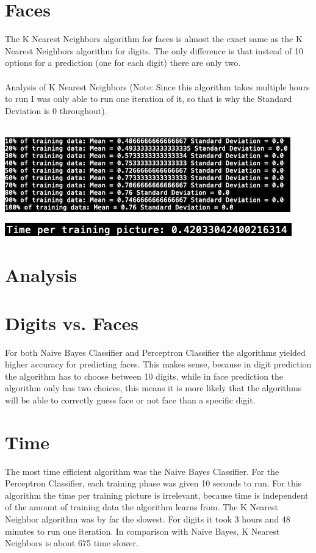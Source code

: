 \documentclass[12pt]{article}
\begin{document}
\section*{Faces}
The K Nearest Neighbors algorithm for faces is almost the exact same as the K Nearest Neighbors algorithm for digits. The only difference is that instead of 10 options for a prediction (one for each digit) there are only two.\\\\
Analysis of K Nearest Neighbors (Note: Since this algorithm takes multiple hours to run I was only able to run one iteration of it, so that is why the Standard Deviation is 0 throughout).\\\\

\begin{center}
\includegraphics{statsFaceKnn.png}
\end{center}

\begin{center}
\includegraphics{timeStatsFaceKnn.png}
\end{center}

\section*{Analysis}
\section*{Digits vs. Faces}
For both Naive Bayes Classifier and Perceptron Classifier the algorithms yielded higher accuracy for predicting faces. This makes sense, because in digit prediction the algorithm has to choose between 10 digits, while in face prediction the algorithm only has two choices, this means it is more likely that the algorithms will be able to correctly guess face or not face than a specific digit. \\

\section*{Time}
The most time efficient algorithm was the Naive Bayes Classifier. For the Perceptron Classifier, each training phase was given 10 seconds to run. For this algorithm the time per training picture is irrelevant, because time is independent of the amount of training data the algorithm learns from. The K Nearest Neighbor algorithm was by far the slowest. For digits it took 3 hours and 48 minutes to run one iteration. In comparison with Naive Bayes, K Nearest Neighbors is about 675 time slower.\\
\end{document}
